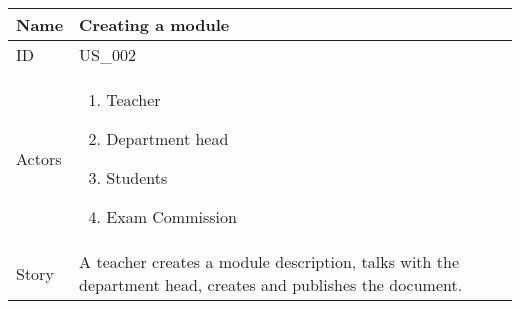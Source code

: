 \documentclass{article}
\newcommand\addrow[2]{#1 &#2\\ }
\newcommand\tabularhead{\begin{tabular}{lp{8cm}}
		\hline
	}
\newcommand\addmulrow[2]{ \begin{minipage}[t][][t]{2.5cm}#1\end{minipage}%
		&\begin{minipage}[t][][t]{8cm}
			\begin{enumerate} #2   \end{enumerate}
		\end{minipage}\\ }
\newenvironment{usecase}{\tabularhead}
	{\hline\end{tabular}}
\begin{document}
	\begin{usecase}
		\addrow{Name}{Creating a module}
		\hline
		\addrow{ID}{US\_002}
		\hline
 		\addmulrow{Actors}{	\item Teacher 
							\item Department head 
							\item Students
							\item Exam Commission}
		\hline		
		\addrow{Story}{A teacher creates a module description, talks with the department head, creates and publishes the document.}
								

	\end{usecase}
	
\end{document}
